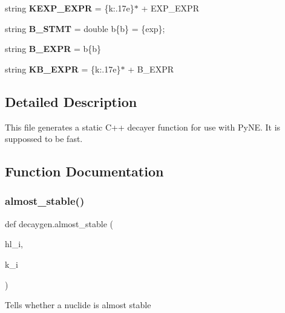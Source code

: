 \begin{DoxyCompactItemize}
string {\bfseries K\+E\+X\+P\+\_\+\+E\+X\+PR} = \textquotesingle{}\{k\+:.\+17e\}$\ast$\textquotesingle{} + E\+X\+P\+\_\+\+E\+X\+PR
\item 
\mbox{\label{namespacedecaygen_a8ad381995532ef87bb0a164a2b267fca}} 
string {\bfseries B\+\_\+\+S\+T\+MT} = \textquotesingle{}double b\{b\} = \{exp\};\textquotesingle{}
\item 
\mbox{\label{namespacedecaygen_ae2470bc63bdc8595efbcca7fbcf9cf3e}} 
string {\bfseries B\+\_\+\+E\+X\+PR} = \textquotesingle{}b\{b\}\textquotesingle{}
\item 
\mbox{\label{namespacedecaygen_a833a3e41af563936f326b6ab8245c965}} 
string {\bfseries K\+B\+\_\+\+E\+X\+PR} = \textquotesingle{}\{k\+:.\+17e\}$\ast$\textquotesingle{} + B\+\_\+\+E\+X\+PR
\end{DoxyCompactItemize}


\subsection{Detailed Description}
\begin{DoxyVerb}This file generates a static C++ decayer function for use with PyNE.
It is suppossed to be fast.
\end{DoxyVerb}
 

\subsection{Function Documentation}
\mbox{\label{namespacedecaygen_a8267524e00bea03ef7218742ef99b713}} 
\subsubsection{\texorpdfstring{almost\+\_\+stable()}{almost\_stable()}}
{\footnotesize\ttfamily def decaygen.\+almost\+\_\+stable (\begin{DoxyParamCaption}\item[{}]{hl\+\_\+i,  }\item[{}]{k\+\_\+i }\end{DoxyParamCaption})}

\begin{DoxyVerb}Tells whether a nuclide is almost stable\end{DoxyVerb}
 \mbox{\label{namespacedecaygen_a03f99e352f15d9f51dcc70013a1fe2d9}} 

